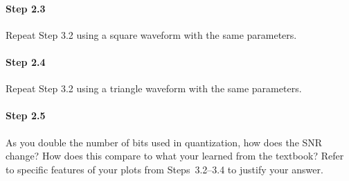   \paragraph{Step 2.3} Repeat Step 3.2 using a square waveform with
  the same parameters.

  \paragraph{Step 2.4} Repeat Step 3.2 using a triangle waveform with
  the same parameters.

  \paragraph{Step 2.5} As you double the number of bits used in
  quantization, how does the SNR change? How does this compare to what
  your learned from the textbook? Refer to specific features of your
  plots from Steps~3.2--3.4 to justify your answer.
